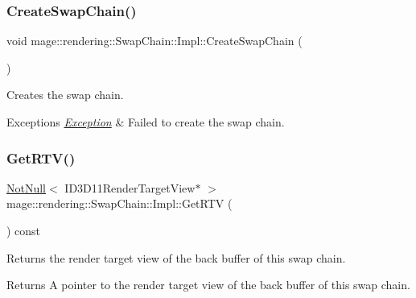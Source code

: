 \subsubsection{\texorpdfstring{Create\+Swap\+Chain()}{CreateSwapChain()}}
{\footnotesize\ttfamily void mage\+::rendering\+::\+Swap\+Chain\+::\+Impl\+::\+Create\+Swap\+Chain (\begin{DoxyParamCaption}{ }\end{DoxyParamCaption})\hspace{0.3cm}{\ttfamily [private]}}

Creates the swap chain.


\begin{DoxyExceptions}{Exceptions}
{\em \hyperlink{classmage_1_1_exception}{Exception}} & Failed to create the swap chain. \\
\hline
\end{DoxyExceptions}
\hypertarget{classmage_1_1rendering_1_1_swap_chain_1_1_impl_a8c21e6075e67d434701fb63933bc114a}{}\label{classmage_1_1rendering_1_1_swap_chain_1_1_impl_a8c21e6075e67d434701fb63933bc114a} 
\subsubsection{\texorpdfstring{Get\+R\+T\+V()}{GetRTV()}}
{\footnotesize\ttfamily \hyperlink{namespacemage_a8769f9d670d6b585ea306cb1062af94b}{Not\+Null}$<$ I\+D3\+D11\+Render\+Target\+View$\ast$ $>$ mage\+::rendering\+::\+Swap\+Chain\+::\+Impl\+::\+Get\+R\+TV (\begin{DoxyParamCaption}{ }\end{DoxyParamCaption}) const\hspace{0.3cm}{\ttfamily [noexcept]}}

Returns the render target view of the back buffer of this swap chain.

\begin{DoxyReturn}{Returns}
A pointer to the render target view of the back buffer of this swap chain. 
\end{DoxyReturn}
\hypertarget{classmage_1_1rendering_1_1_swap_chain_1_1_impl_a58ee8003efb4b792d6e6315a1a691b5c}{}\label{classmage_1_1rendering_1_1_swap_chain_1_1_impl_a58ee8003efb4b792d6e6315a1a691b5c} 
